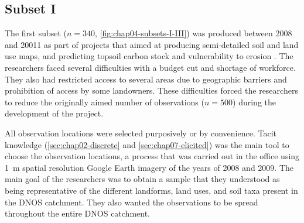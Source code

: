 \subsection{Subset I}

The first subset ($n = 340$, \autoref{fig:chap04-subsets-I-III}) was produced between 2008 and 20011 as part 
of projects that aimed at producing semi-detailed soil and land use maps, and predicting topsoil carbon stock 
and vulnerability to erosion \cite{Samuel-Rosa2009, SamuelRosaEtAl2011a, MiguelEtAl2012, Moura-BuenoEtAl2012, 
Samuel-RosaEtAl2013}. The researchers faced several difficulties with a budget cut and shortage of workforce. 
They also had restricted access to several areas due to geographic barriers and prohibition of access by some 
landowners. These difficulties forced the researchers to reduce the originally aimed number of observations 
($n = 500$) during the development of the project.

All observation locations were selected purposively or by convenience. Tacit knowledge 
(\autoref{sec:chap02-discrete} and \autoref{sec:chap07-elicited}) was the main tool to choose the observation 
locations, a process that was carried out in the office using \SI{1}{\metre} spatial resolution Google 
Earth\rr{} imagery of the years of \num{2008} and \num{2009}. The main goal of the researchers was to obtain a 
sample that they understood as being representative of the different landforms, land uses, and soil taxa 
present in the DNOS catchment. They also wanted the observations to be spread throughout the entire DNOS 
catchment.

\def\footsupport{\footnote{\emph{Sample support} refers to the shape, size and orientation of sampling units, 
the latter being the smallest single entity that we are able or choose to observe in the universe of interest, 
i.e. the sampling region. A discrete universe such as a forest is defined by the collection of these single 
entities. However, by definition, such single entities have no real, physical existence in continuous 
universes such as the soil -- their \q{existence} require our prior, more or less arbitrary, definition of 
their shape, size and orientation. This definition is usually based on theoretical and practical 
considerations. For example, the sampling unit can be defined as a roughly polygonal block that is large 
enough to encompass the pattern of small-scale local vertical (\SI{\leq2}{\m}) and horizontal 
(1--\SI{10}{\square\metre}) variability of soil properties -- a pedon. Depending on the size of the sampling 
unit relative to the universe of interest, the sample support is referred to as \emph{areal} or \emph{point} 
sample support. A pedon of \SI{10}{\square\metre} area observed in an agricultural field of \SI{1}{\hectare} 
corresponds to the \emph{areal sample support}. However, the same pedon observed in a catchment of 
\SI{200}{\hectare} would correspond to the \emph{point sample support}.}}

